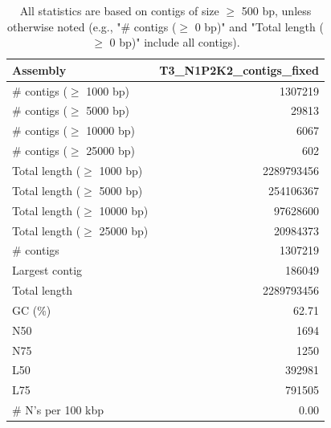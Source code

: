 \documentclass[12pt,a4paper]{article}
\begin{document}
\begin{table}[ht]
\begin{center}
\caption{All statistics are based on contigs of size $\geq$ 500 bp, unless otherwise noted (e.g., "\# contigs ($\geq$ 0 bp)" and "Total length ($\geq$ 0 bp)" include all contigs).}
\begin{tabular}{|l*{1}{|r}|}
\hline
Assembly & T3\_N1P2K2\_contigs\_fixed \\ \hline
\# contigs ($\geq$ 1000 bp) & 1307219 \\ \hline
\# contigs ($\geq$ 5000 bp) & 29813 \\ \hline
\# contigs ($\geq$ 10000 bp) & 6067 \\ \hline
\# contigs ($\geq$ 25000 bp) & 602 \\ \hline
Total length ($\geq$ 1000 bp) & 2289793456 \\ \hline
Total length ($\geq$ 5000 bp) & 254106367 \\ \hline
Total length ($\geq$ 10000 bp) & 97628600 \\ \hline
Total length ($\geq$ 25000 bp) & 20984373 \\ \hline
\# contigs & 1307219 \\ \hline
Largest contig & 186049 \\ \hline
Total length & 2289793456 \\ \hline
GC (\%) & 62.71 \\ \hline
N50 & 1694 \\ \hline
N75 & 1250 \\ \hline
L50 & 392981 \\ \hline
L75 & 791505 \\ \hline
\# N's per 100 kbp & 0.00 \\ \hline
\end{tabular}
\end{center}
\end{table}
\end{document}
